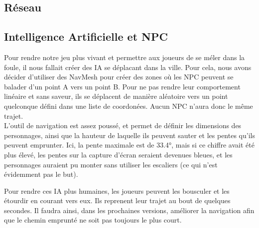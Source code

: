 \documentclass[french, 12pt]{article}
\begin{document}
    \subsection{Réseau}


    \subsection{Intelligence Artificielle et NPC}

    Pour rendre notre jeu plus vivant et permettre aux joueurs de se méler dans la foule,
    il nous fallait créer des IA se déplacant dans la ville.
    Pour cela, nous avons décider d'utiliser des NavMesh pour créer des zones où les 
    NPC peuvent se balader d'un point A vers un point B.
    Pour ne pas rendre leur comportement linéaire et sans saveur,
    ils se déplacent de manière aléatoire  vers un point quelconque défini dans une liste de coordonées.
    Aucun NPC n'aura donc le même trajet.\\

    L’outil de navigation est assez poussé, et permet de définir les dimensions des personnages,
    ainsi que la hauteur de laquelle ils peuvent sauter et les pentes qu’ils peuvent emprunter.
    Ici, la pente maximale est de 33.4°, mais si ce chiffre avait été plus élevé,
    les pentes sur la capture d’écran seraient devenues bleues, et les personnages auraient pu
    monter sans utiliser les escaliers (ce qui n’est évidemment pas le but).


    Pour rendre ces IA plus humaines, les joueurs peuvent les bousculer et les étourdir en courant vers eux.
    Ils reprenent leur trajet au bout de quelques secondes. Il faudra ainsi, dans les prochaines versions, améliorer la navigation afin que le chemin emprunté ne soit pas toujours le plus court. 
\end{document}
